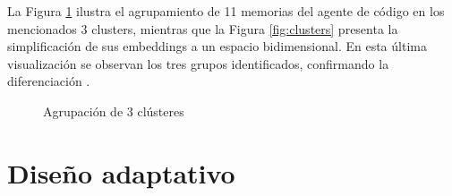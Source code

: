 La Figura \ref{fig:clustering-analysis} ilustra el agrupamiento de 11 memorias del agente de código en los mencionados 3 clusters, mientras que la Figura \ref{fig:clusters} presenta la simplificación de sus embeddings a un espacio bidimensional. En esta última visualización se observan los tres grupos identificados, confirmando la diferenciación  .

\begin{figure}[htbp]
    \centering
    
    \caption{Agrupación de 3 clústeres}
    \label{fig:clustering-analysis}
\end{figure}

\section{Diseño adaptativo}
